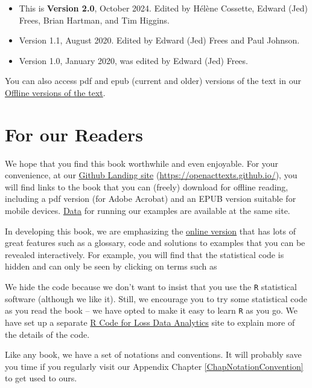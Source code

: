 \documentclass[
  12pt,
  krantz2]{Format/krantzNoCorner}
\providecommand{\tightlist}{%
  \setlength{\itemsep}{0pt}\setlength{\parskip}{0pt}}
\begin{document}
\begin{itemize}
\tightlist
\item
  This is \textbf{Version 2.0}, October 2024. Edited by Hélène Cossette, Edward (Jed) Frees, Brian Hartman, and Tim Higgins.
\item
  Version 1.1, August 2020. Edited by Edward (Jed) Frees and Paul Johnson.
\item
  Version 1.0, January 2020, was edited by Edward (Jed) Frees.
\end{itemize}

You can also access pdf and epub (current and older) versions of the text in our \href{https://ewfrees.github.io/Loss-Data-Analytics/DownloadOffline.html}{Offline versions of the text}.

\hypertarget{for-our-readers}{%
\section*{For our Readers}\label{for-our-readers}}


We hope that you find this book worthwhile and even enjoyable. For your convenience, at our \href{https://openacttexts.github.io/}{Github Landing site} (\url{https://openacttexts.github.io/}), you will find links to the book that you can (freely) download for offline reading, including a pdf version (for Adobe Acrobat) and an EPUB version suitable for mobile devices. \href{https://github.com/OpenActTexts/Loss-Data-Analytics/tree/master/Data}{Data} for running our examples are available at the same site.

In developing this book, we are emphasizing the \href{https://openacttexts.github.io/Loss-Data-Analytics/index.html}{online version} that has lots of great features such as a glossary, code and solutions to examples that you can be revealed interactively. For example, you will find that the statistical code is hidden and can only be seen by clicking on terms such as

We hide the code because we don't want to insist that you use the \texttt{R} statistical software (although we like it). Still, we encourage you to try some statistical code as you read the book -- we have opted to make it easy to learn \texttt{R} as you go. We have set up a separate \href{https://openacttexts.github.io/LDARcode}{R Code for Loss Data Analytics} site to explain more of the details of the code.

Like any book, we have a set of notations and conventions. It will probably save you time if you regularly visit our Appendix Chapter \ref{ChapNotationConvention} to get used to ours.
\end{document}
